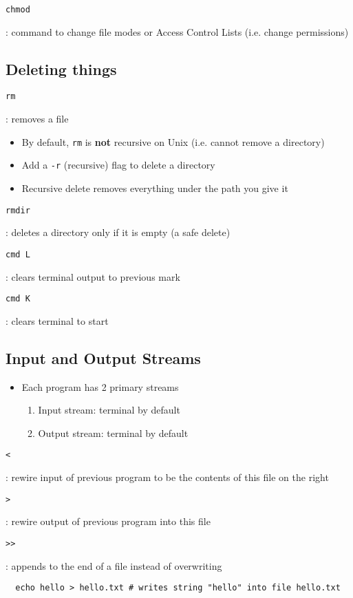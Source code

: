 \documentclass[letterpaper,12pt]{article}
\newcommand*{\lstitem}[1]{
  \setbox0\hbox{\lstinline{#1}}
  \item[\usebox0]
}
\begin{document}
\begin{description}
 \lstitem{chmod}: command to change file modes or Access Control Lists (i.e. change permissions)
\end{description}

\subsection{Deleting things}
\begin{description}
 \lstitem{rm}: removes a file
\end{description}

\begin{itemize}
 \item By default, \lstinline{rm} is \textbf{not} recursive on Unix (i.e. cannot remove a directory)
 \item Add a \lstinline{-r} (recursive) flag to delete a directory
 \item Recursive delete removes everything under the path you give it
\end{itemize}

\begin{description}
 \lstitem{rmdir}: deletes a directory only if it is empty (a safe delete)
 \lstitem{cmd L}: clears terminal output to previous mark
 \lstitem{cmd K}: clears terminal to start
\end{description}

\subsection{Input and Output Streams}
\begin{itemize}
 \item Each program has 2 primary streams
       \begin{enumerate}
        \item Input stream: terminal by default
        \item Output stream: terminal by default
       \end{enumerate}
\end{itemize}

\begin{description}
 \lstitem{<}: rewire input of previous program to be the contents of this file on the right
 \lstitem{>}: rewire output of previous program into this file
 \lstitem{>>}: appends to the end of a file instead of overwriting
\end{description}

\begin{lstlisting}
  echo hello > hello.txt # writes string "hello" into file hello.txt
\end{lstlisting}
\end{document}
